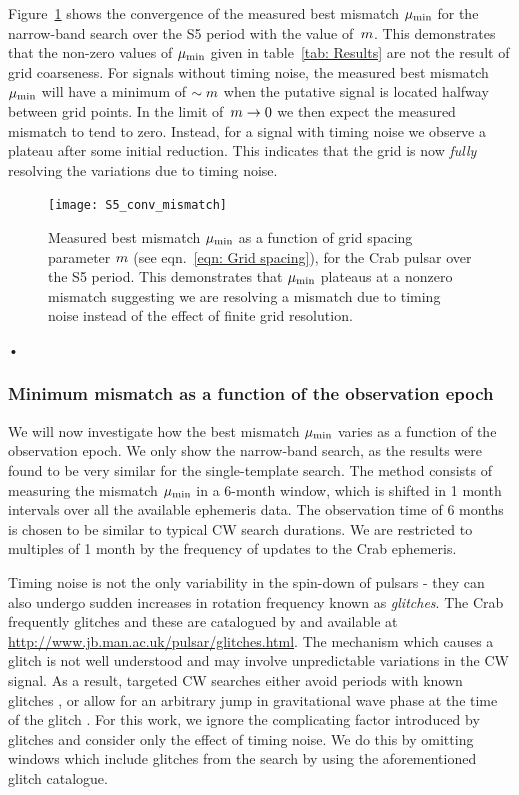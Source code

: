 \documentclass[../full_thesis/full_thesis.tex]{subfiles}
\begin{document}
Figure~\ref{fig: conv} shows the convergence of the measured best mismatch
$\mu_{\mathrm{min}}$ for the narrow-band search over the S5 period with the value
of~$m$.  This demonstrates that the non-zero values of $\mu_{\mathrm{min}}$ given in
table~\ref{tab: Results} are not the result of grid coarseness.  For signals
without timing noise, the measured best mismatch $\mu_{\mathrm{min}}$ will have a minimum
of $\sim m$ when the putative signal is located halfway between grid
points. In the limit of~$m \rightarrow 0$ we then expect the measured
mismatch to tend to zero. Instead, for a signal with timing noise we observe a
plateau after some initial reduction. This indicates that the grid is now
\emph{fully} resolving the variations due to timing noise.
\begin{figure}[htb]
\centering
\texttt{[image: S5\_conv\_mismatch]}
\caption{Measured best mismatch $\mu_{\mathrm{min}}$ as a function
of grid spacing parameter $m$ (see eqn.~\eqref{eqn: Grid spacing}), for the Crab pulsar over the S5 period.
    This demonstrates that $\mu_{\mathrm{min}}$ plateaus at a nonzero mismatch suggesting
    we are resolving a mismatch due to timing noise instead of the effect of finite
    grid resolution.}
\label{fig: conv}
\end{figure}•





\subsubsection{Minimum mismatch as a function of the observation epoch}
\label{sec: Minimum mismatch as a function of the observation epoch}

We will now investigate how the best mismatch $\mu_{\mathrm{min}}$ varies as a function of
the observation epoch. We only show the narrow-band search, as the results were
found to be very similar for the single-template search. The method consists of
measuring the mismatch $\mu_{\mathrm{min}}$ in a 6-month window, which is shifted in 1
month intervals over all the available ephemeris data. The observation time of
6 months is chosen to be similar to typical CW search durations. We are
restricted to multiples of 1 month by the frequency of updates to the Crab
ephemeris.

Timing noise is not the only variability in the spin-down of pulsars - they can
also undergo sudden increases in rotation frequency known as \emph{glitches}.
The Crab frequently glitches and these are catalogued by \citet{Espinoza2011}
and available at \url{http://www.jb.man.ac.uk/pulsar/glitches.html}.
The mechanism which causes a glitch is not well understood and may involve
unpredictable variations in the CW signal. As a result, targeted CW searches
either avoid periods with known glitches \citep{ligo2008}, or 
allow for an arbitrary jump in gravitational wave phase at the time of
the glitch \citep{LIGO2010}. For this work, we ignore
the complicating factor introduced by glitches and consider 
only the effect of timing noise. We do this by
omitting windows which include glitches from the search by using
the aforementioned glitch catalogue.
\end{document}
